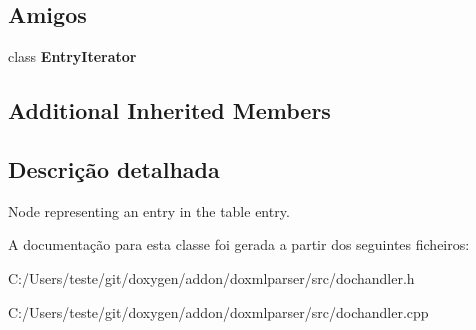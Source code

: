\subsection*{Amigos}
\begin{DoxyCompactItemize}
\item 
\hypertarget{class_entry_handler_a9dcc4c9cf395c516267b6a3804c38c76}{class {\bfseries Entry\-Iterator}}\label{class_entry_handler_a9dcc4c9cf395c516267b6a3804c38c76}

\end{DoxyCompactItemize}
\subsection*{Additional Inherited Members}


\subsection{Descrição detalhada}
Node representing an entry in the table entry. 



A documentação para esta classe foi gerada a partir dos seguintes ficheiros\-:\begin{DoxyCompactItemize}
\item 
C\-:/\-Users/teste/git/doxygen/addon/doxmlparser/src/dochandler.\-h\item 
C\-:/\-Users/teste/git/doxygen/addon/doxmlparser/src/dochandler.\-cpp\end{DoxyCompactItemize}

